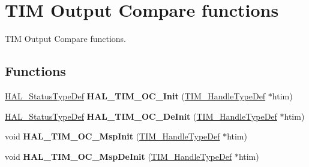 \hypertarget{group___t_i_m___exported___functions___group2}{}\section{T\+IM Output Compare functions}
\label{group___t_i_m___exported___functions___group2}


T\+IM Output Compare functions.  


\subsection*{Functions}
\begin{DoxyCompactItemize}
\item 
\mbox{\label{group___t_i_m___exported___functions___group2_ga7541c3db71ec7c0b4b54afa473bdb19a}} 
\hyperlink{stm32f4xx__hal__def_8h_a63c0679d1cb8b8c684fbb0632743478f}{H\+A\+L\+\_\+\+Status\+Type\+Def} {\bfseries H\+A\+L\+\_\+\+T\+I\+M\+\_\+\+O\+C\+\_\+\+Init} (\hyperlink{struct_t_i_m___handle_type_def}{T\+I\+M\+\_\+\+Handle\+Type\+Def} $\ast$htim)
\item 
\mbox{\label{group___t_i_m___exported___functions___group2_ga79f0c3e3015a81c535a578edc2fee8ca}} 
\hyperlink{stm32f4xx__hal__def_8h_a63c0679d1cb8b8c684fbb0632743478f}{H\+A\+L\+\_\+\+Status\+Type\+Def} {\bfseries H\+A\+L\+\_\+\+T\+I\+M\+\_\+\+O\+C\+\_\+\+De\+Init} (\hyperlink{struct_t_i_m___handle_type_def}{T\+I\+M\+\_\+\+Handle\+Type\+Def} $\ast$htim)
\item 
\mbox{\label{group___t_i_m___exported___functions___group2_gab7ea7555b79c4544ad90dc6d063d2f13}} 
void {\bfseries H\+A\+L\+\_\+\+T\+I\+M\+\_\+\+O\+C\+\_\+\+Msp\+Init} (\hyperlink{struct_t_i_m___handle_type_def}{T\+I\+M\+\_\+\+Handle\+Type\+Def} $\ast$htim)
\item 
\mbox{\label{group___t_i_m___exported___functions___group2_ga2f01705566708fcaceb32bcad01f7498}} 
void {\bfseries H\+A\+L\+\_\+\+T\+I\+M\+\_\+\+O\+C\+\_\+\+Msp\+De\+Init} (\hyperlink{struct_t_i_m___handle_type_def}{T\+I\+M\+\_\+\+Handle\+Type\+Def} $\ast$htim)
\item 
\mbox{\label{group___t_i_m___exported___functions___group2_ga5dbbafc75b341b79d29bc41f8ec15492}} 

\end{DoxyCompactItemize}
